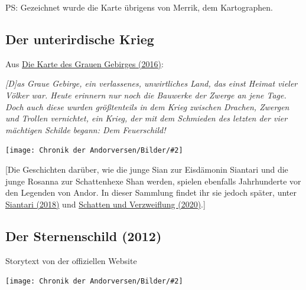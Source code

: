 \documentclass[10pt, a4paper, oneside]{book}
\newcommand{\fillbreak}{\vspace*{\fill}\columnbreak}
\newcommand{\storytext}[1]{%
    \section{#1}%
    \label{Storytext: #1}%
}
\newcommand{\refprodukt}[1]{\hyperref[Produkt: #1]{#1}}
\newcommand{\refstorytext}[1]{\hyperref[Storytext: #1]{#1}}
\newcommand{\bildmitts}[2][height=0.32\textwidth,width=0.48\textwidth,keepaspectratio]{%
    \begin{center}
        \texttt{[image: Chronik der Andorversen/Bilder/\#2]}
    \end{center}
}
\begin{document}
PS: Gezeichnet wurde die Karte übrigens von Merrik, dem Kartographen.


\newpage














\begin{multicols}{2}

\begin{chapterbox}

    \chapter{Der unterirdische Krieg}
    
    
    
    \begin{center}
        Aus \refprodukt{Die Karte des Grauen Gebirges (2016)}:
    \end{center}
    
    \textit{[D]as Graue Gebirge, ein verlassenes, unwirtliches Land, das einst Heimat vieler Völker war. Heute erinnern nur noch die Bauwerke der Zwerge an jene Tage. Doch auch diese wurden größtenteils in dem Krieg zwischen Drachen, Zwergen und Trollen vernichtet, ein Krieg, der mit dem Schmieden des letzten der vier mächtigen Schilde begann: Dem Feuerschild!}\bigskip
    
    \bildmitts[width=\textwidth]{Kreatok und Nehal.jpeg}
    
    
    [Die Geschichten darüber, wie die junge Sian zur Eisdämonin Siantari und die junge Rosanna zur Schattenhexe Shan werden, spielen ebenfalls Jahrhunderte vor den Legenden von Andor. In dieser Sammlung findet ihr sie jedoch später, unter \refstorytext{Siantari (2018)} und \refstorytext{Schatten und Verzweiflung (2020)}.]

\end{chapterbox}





    

\fillbreak
\storytext{Der Sternenschild (2012)}

\begin{center}
    Storytext von der offiziellen Website
\end{center}

\bildmitts{Der Sternenschild Bild 1.jpg}


\end{multicols}
\end{document}
